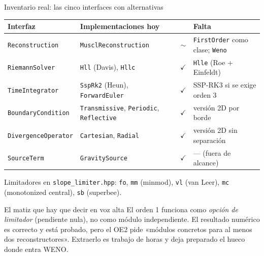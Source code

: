\documentclass[aspectratio=169,10pt]{beamer}
\newcommand{\si}{\textcolor{verde}{$\checkmark$}}
\newcommand{\parc}{\textcolor{naranja}{$\sim$}}
\newcommand{\cod}[1]{\texttt{\small #1}}
\begin{document}
\begin{frame}[shrink]{Inventario real: las cinco interfaces con alternativas}
  \centering
  \scriptsize
  \begin{tabular}{@{}llcl@{}}
    \toprule
    \textbf{Interfaz} & \textbf{Implementaciones hoy} & & \textbf{Falta} \\
    \midrule
    \cod{Reconstruction}   & \cod{MusclReconstruction}                    & \parc & \cod{FirstOrder} como clase; \cod{Weno} \\
    \cod{RiemannSolver}    & \cod{Hll} (Davis), \cod{Hllc}                & \si   & \cod{Hlle} (Roe + Einfeldt) \\
    \cod{TimeIntegrator}   & \cod{SspRk2} (Heun), \cod{ForwardEuler}      & \si   & SSP-RK3 si se exige orden 3 \\
    \cod{BoundaryCondition}& \cod{Transmissive}, \cod{Periodic}, \cod{Reflective} & \si & versión 2D por borde \\
    \cod{DivergenceOperator}& \cod{Cartesian}, \cod{Radial}               & \si   & versión 2D sin separación \\
    \cod{SourceTerm}       & \cod{GravitySource}                          & \si   & --- (fuera de alcance) \\
    \bottomrule
  \end{tabular}

  \vspace{0.5em}
  \scriptsize
  Limitadores en \cod{slope\_limiter.hpp}: \cod{fo}, \cod{mm} (minmod),
  \cod{vl} (van Leer), \cod{mc} (monotonized central), \cod{sb} (superbee).

  \vspace{0.5em}
  \begin{alertblock}{El matiz que hay que decir en voz alta}
    \scriptsize
    El orden 1 funciona como \emph{opción de limitador} (pendiente nula), no como
    módulo independiente. El resultado numérico es correcto y está probado, pero
    el OE2 pide «módulos concretos para al menos dos reconstructores».
    Extraerlo es trabajo de horas y deja preparado el hueco donde entra WENO.
  \end{alertblock}
\end{frame}
\end{document}
